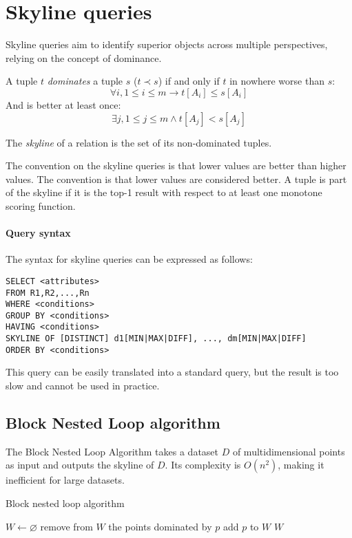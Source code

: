 \section{Skyline queries}

Skyline queries aim to identify superior objects across multiple perspectives, relying on the concept of dominance.
\begin{definition}
    A tuple $t$ \emph{dominates} a tuple $s$ ($t \prec s$) if and only if $t$ in nowhere worse than $s$: 
    \[\forall i, 1 \leq i \leq m \rightarrow t[A_i] \leq s[A_i]\] 
    And is better at least once: 
    \[\exists j, 1 \leq j \leq m \land t[A_j] < s[A_j]\]

    The \emph{skyline} of a relation is the set of its non-dominated tuples.
\end{definition}
The convention on the skyline queries is that lower values are better than higher values.
The convention is that lower values are considered better. 
A tuple is part of the skyline if it is the top-1 result with respect to at least one monotone scoring function. 

\paragraph*{Query syntax}
The syntax for skyline queries can be expressed as follows:
\begin{lstlisting}[style=SQL]
SELECT <attributes>
FROM R1,R2,...,Rn
WHERE <conditions>
GROUP BY <conditions>
HAVING <conditions>
SKYLINE OF [DISTINCT] d1[MIN|MAX|DIFF], ..., dm[MIN|MAX|DIFF]
ORDER BY <conditions>
\end{lstlisting}
This query can be easily translated into a standard query, but the result is too slow and cannot be used in practice. 

\subsection{Block Nested Loop algorithm}
The Block Nested Loop Algorithm takes a dataset $D$ of multidimensional points as input and outputs the skyline of $D$. 
Its complexity is $O(n^2)$, making it inefficient for large datasets.
\begin{algorithm}[H]
    \caption{Block nested loop algorithm}
        \begin{algorithmic}[1]
            \State $W \leftarrow \varnothing$
                    \State remove from $W$ the points dominated by $p$
                    \State add $p$ to $W$
                \EndIf
            \EndFor
            \State \Return $W$
        \end{algorithmic}
\end{algorithm}

